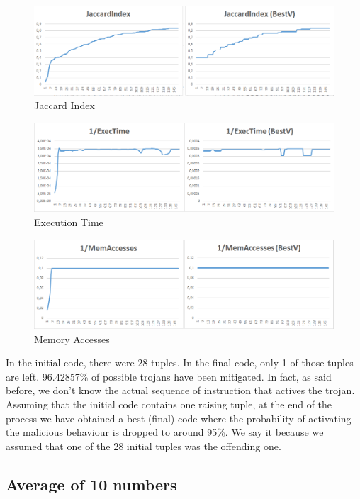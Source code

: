 \documentclass[a4paper,twoside]{article}
\theoremstyle{definition}
\theoremstyle{remark}
\begin{document}
\begin{figure}[H]
\includegraphics[scale=0.5]{Immagini/08}
\caption{Jaccard Index}
\end{figure}

\begin{figure}[H]
\includegraphics[scale=0.5]{Immagini/09}
\caption{Execution Time}
\end{figure}

\begin{figure}[H]
\includegraphics[scale=0.5]{Immagini/10}
\caption{Memory Accesses}
\end{figure}

In the initial code, there were 28 tuples.
In the final code, only 1 of those tuples are left.
96.42857\% of possible trojans have been mitigated. In fact, as said before, we don't know the actual sequence of instruction that actives the trojan. Assuming that the initial code contains one raising tuple, at the end of the process we have obtained a best (final) code where the probability of activating the malicious behaviour is dropped to around 95\%. We say it because we assumed that one of the 28 initial tuples was the offending one.

\newpage
\subsection{Average of 10 numbers}
\end{document}
